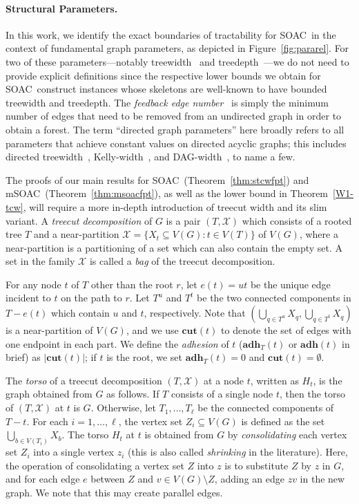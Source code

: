 \documentclass[letterpaper]{article} %
\newcommand{\problem}{{\sc SOAC}\xspace} %
\newcommand{\mproblem}{{\sc mSOAC}\xspace} %
\newcommand{\cut}{{\mathbf{cut}}}
\newcommand{\adh}{{\mathbf{adh}}}
\begin{document}
\paragraph{Structural Parameters.}
In this work, we identify the exact boundaries of tractability for \problem\ in the context of fundamental graph parameters, as depicted in Figure~\ref{fig:pararel}.
For two of these parameters---notably treewidth~\cite{RobertsonS86} and treedepth~\cite{sparsity}---we do not need to provide explicit definitions since the respective lower bounds we obtain for \problem\ construct instances whose skeletons are well-known to have bounded treewidth and treedepth. The \emph{feedback edge number}~\cite{KoanaKNNZ21,FuchsleMNR22} is simply the minimum number of edges that need to be removed from an undirected graph in order to obtain a forest.
The term ``directed graph parameters'' here broadly refers to all parameters that achieve constant values on directed acyclic graphs; this includes directed treewidth~\cite{JohnsonRST01}, Kelly-width~\cite{hunter2008digraph}, and DAG-width~\cite{BerwangerDHKO12}, to name a few.

The proofs of our main results for \problem\ (Theorem~\ref{thm:stcwfpt}) and \mproblem\ (Theorem~\ref{thm:msoacfpt}), as well as the lower bound in Theorem~\ref{W1-tcw}, will require a more in-depth introduction of treecut width and its slim variant.
A {\em treecut decomposition} of $G$ is a pair $(T,\mathcal{X})$ which consists of a rooted tree $T$ and a near-partition $\mathcal{X}=\{X_t\subseteq V(G): t\in V(T)\}$ of $V(G)$, where a near-partition is a partitioning of a set which can also contain the empty set. A set in the family $\mathcal{X}$ is called a {\em bag} of the treecut decomposition.


For any node $t$ of $T$ other than the root $r$, let $e(t)=ut$ be the unique edge incident to $t$ on the path to $r$. Let $T^u$ and $T^t$ be the two connected components in $T-e(t)$ which contain $u$ and $t$, respectively. Note that $(\bigcup_{q\in T^u} X_q, \bigcup_{q\in T^t} X_q)$ is a near-partition of $V(G)$, and we use $\cut(t)$ to denote the set of edges with one endpoint in each part. We define the {\em adhesion} of $t$ ($\adh_T(t)$ or $\adh(t)$ in brief) as $|\cut(t)|$; if $t$ is the root, we set $\adh_T(t)=0$ and $\cut(t)=\emptyset$.

The {\em torso} of a treecut decomposition $(T,\mathcal{X})$ at a node $t$, written as $H_t$, is the graph obtained from $G$ as follows. If $T$ consists of a single node $t$, then the torso of $(T,\mathcal{X})$ at $t$ is $G$. Otherwise, let $T_1, \ldots , T_{\ell}$ be the connected components of $T-t$. For each $i=1,\ldots , \ell$, the vertex set $Z_i\subseteq V(G)$ is defined as the set $\bigcup_{b\in V(T_i)}X_b$. The torso $H_t$ at $t$ is obtained from $G$ by {\em consolidating} each vertex set $Z_i$ into a single vertex $z_i$ (this is also called \emph{shrinking} in the literature). Here, the operation of consolidating a vertex set $Z$ into $z$ is to substitute $Z$ by $z$ in $G$, and for each edge $e$ between $Z$ and $v\in V(G)\setminus Z$, adding an edge $zv$ in the new graph. We note that this may create parallel edges.
\end{document}

